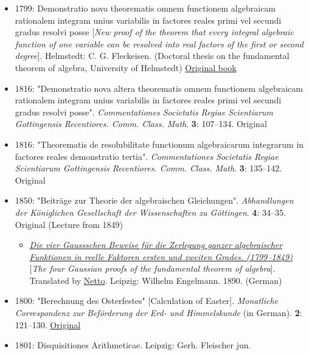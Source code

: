 \begin{itemize}
\tightlist
\item
  {1799: Demonstratio nova theorematis omnem functionem algebraicam rationalem integram unius variabilis in factores reales primi vel secundi gradus resolvi posse {{[}}\emph{New proof of the theorem that every integral algebraic function of one variable can be resolved into real factors of the first or second degree}{{]}}. Helmstedt: C. G. Fleckeisen.{} (Doctoral thesis on the fundamental theorem of algebra, University of Helmstedt) \href{https://edoc.hu-berlin.de/handle/18452/732}{Original book}}
\item
  {1816: "Demonstratio nova altera theorematis omnem functionem algebraicam rationalem integram unius variabilis in factores reales primi vel secundi gradus resolvi posse". \emph{Commentationes Societatis Regiae Scientiarum Gottingensis Recentiores. Comm. Class. Math}. \textbf{3}: {107--}134.{} Original}
\item
  {1816: "Theorematis de resolubilitate functionum algebraicarum integrarum in factores reales demonstratio tertia". \emph{Commentationes Societatis Regiae Scientiarum Gottingensis Recentiores. Comm. Class. Math}. \textbf{3}: {135--}142.{} Original}
\item
  {1850: "Beiträge zur Theorie der algebraischen Gleichungen". \emph{Abhandlungen der Königlichen Gesellschaft der Wissenschaften zu Göttingen}. \textbf{4}: {34--}35.{} Original (Lecture from 1849)}

  \begin{itemize}
  \tightlist
  \item
    {\href{https://archive.org/details/bub_gb_LoW4AAAAIAAJ/mode/2up}{\emph{Die vier Gauss\textquotesingle schen Beweise für die Zerlegung ganzer algebraischer Funktionen in reelle Faktoren ersten und zweiten Grades. (1799--1849)}} {{[}}\emph{The four Gaussian proofs of the fundamental theorem of algebra}{{]}}. Translated by \href{https://en.wikipedia.org/wiki/Eugen_Netto}{Netto}. Leipzig: Wilhelm Engelmann. 1890.{} (German)}
  \end{itemize}
\item
  {1800: "Berechnung des Osterfestes" {{[}}Calculation of Easter{{]}}. \emph{Monatliche Correspondenz zur Beförderung der Erd- und Himmelskunde} (in German). \textbf{2}: {121--}130.{} \href{https://zs.thulb.uni-jena.de/receive/jportal_jpvolume_00201970}{Original}}
\item
  {1801: Disquisitiones Arithmeticae. Leipzig: Gerh. Fleischer jun.{}}


\end{itemize}
